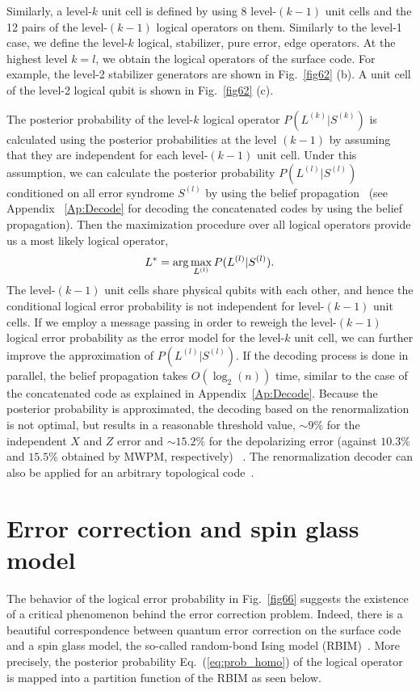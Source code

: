 Similarly, a level-$k$ unit cell is defined 
by using 8 level-$(k-1)$ unit cells and the 12 pairs of 
the level-$(k-1)$ logical operators on them.
Similarly to the level-1 case,
we define the level-$k$ logical, stabilizer, pure error, edge operators.
At the highest level $k=l$,
we obtain the logical operators of the surface code.
For example, the level-2 stabilizer generators are shown in Fig.~\ref{fig62} (b).
A unit cell of the level-2 logical qubit is shown in Fig.~\ref{fig62} (c).

The posterior probability of the level-$k$
logical operator $P(L^{(k)} | S^{(k)})$ is calculated
using the posterior probabilities at the level $(k-1)$
by assuming that they are independent for each level-$(k-1)$ unit cell.
Under this assumption,
we can calculate the posterior probability $P(L^{(l)}|S^{(l)})$
conditioned on all error syndrome $S^{(l)}$ 
by using the belief propagation~\cite{Poulin06,DuclosPoulin1,DuclosPoulin2} 
(see Appendix ~\ref{Ap:Decode} for 
decoding the concatenated codes by using the belief propagation).
Then the maximization procedure over all logical operators
provide us a most likely logical operator,
\begin{eqnarray}
L^*= {\rm arg}\max _{L^{(l)}} P(L^{(l)} | S^{(l)}).
\end{eqnarray}
The level-$(k-1)$ unit cells share physical qubits with each other, and hence the conditional logical error probability is not independent 
for level-$(k-1)$ unit cells. 
If we employ a message passing in order to reweigh
the level-$(k-1)$ logical error probability as the error model 
for the level-$k$ unit cell,
we can further improve the approximation of $P(L^{(l)} | S^{(l)})$.
If the decoding process is done in parallel, the belief propagation takes $O(\log_2 (n))$ time, similar to the case of the concatenated code as explained in Appendix~\ref{Ap:Decode}.
Because the posterior probability is approximated, the decoding based on the renormalization is not optimal, but results in a reasonable threshold value,
$\sim 9\%$ for the independent $X$ and $Z$ error
and $\sim 15.2\%$ for the depolarizing error
(against $10.3\%$ and $15.5\%$ obtained by MWPM, respectively)
~\cite{DuclosPoulin1,DuclosPoulin2}.
The renormalization decoder can also be applied for an arbitrary topological code~\cite{BombinTopoStab}.


\section{Error correction and spin glass model}
\label{Sec:TQECandSpinGlass}
The behavior of the logical error probability in Fig.~\ref{fig66} suggests the existence of a critical phenomenon behind the error correction problem.
Indeed, there is a beautiful correspondence between quantum error correction on the surface code and a spin glass model, the so-called random-bond Ising model (RBIM)~\cite{Dennis}.
More precisely, the posterior probability Eq.\ (\ref{eq:prob_homo}) of the logical operator is mapped into a partition function of the RBIM as seen below.

